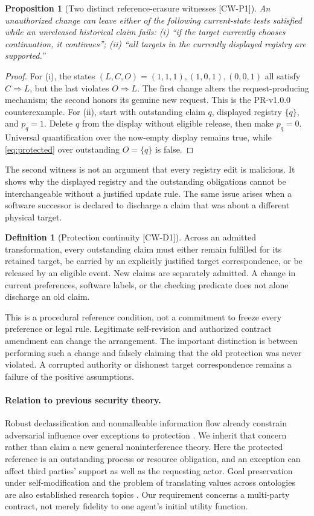 \documentclass[11pt,a4paper]{article}
\newtheorem{proposition}[theorem]{Proposition}
\theoremstyle{definition}\newtheorem{definition}{Definition}
\newcommand{\idtag}[1]{\textnormal{\textsf{[#1]}}}
\begin{document}
\begin{proposition}[Two distinct reference-erasure witnesses \idtag{CW-P1}]
\label{prop:erasure}
An unauthorized change can leave either of the following current-state tests satisfied while an unreleased historical claim fails: (i) ``if the target currently chooses continuation, it continues''; (ii) ``all targets in the currently displayed registry are supported.''
\end{proposition}
\begin{proof}
For (i), the states $(L,C,O)=(1,1,1),(1,0,1),(0,0,1)$ all satisfy $C\Rightarrow L$, but the last violates $O\Rightarrow L$. The first change alters the request-producing mechanism; the second honors its genuine new request. This is the PR-v1.0.0 counterexample. For (ii), start with outstanding claim $q$, displayed registry $\{q\}$, and $p_q=1$. Delete $q$ from the display without eligible release, then make $p_q=0$. Universal quantification over the now-empty display remains true, while \cref{eq:protected} over outstanding $O=\{q\}$ is false.
\end{proof}
The second witness is not an argument that every registry edit is malicious. It shows why the displayed registry and the outstanding obligations cannot be interchangeable without a justified update rule. The same issue arises when a software successor is declared to discharge a claim that was about a different physical target.

\begin{definition}[Protection continuity \idtag{CW-D1}]
Across an admitted transformation, every outstanding claim must either remain fulfilled for its retained target, be carried by an explicitly justified target correspondence, or be released by an eligible event. New claims are separately admitted. A change in current preferences, software labels, or the checking predicate does not alone discharge an old claim.
\end{definition}
This is a procedural reference condition, not a commitment to freeze every preference or legal rule. Legitimate self-revision and authorized contract amendment can change the arrangement. The important distinction is between performing such a change and falsely claiming that the old protection was never violated. A corrupted authority or dishonest target correspondence remains a failure of the positive assumptions.

\paragraph{Relation to previous security theory.}
Robust declassification and nonmalleable information flow already constrain adversarial influence over exceptions to protection \cite{myers,cecchetti}. We inherit that concern rather than claim a new general noninterference theory. Here the protected reference is an outstanding process or resource obligation, and an exception can affect third parties' support as well as the requesting actor. Goal preservation under self-modification and the problem of translating values across ontologies are also established research topics \cite{everitt,deblanc}. Our requirement concerns a multi-party contract, not merely fidelity to one agent's initial utility function.
\end{document}
